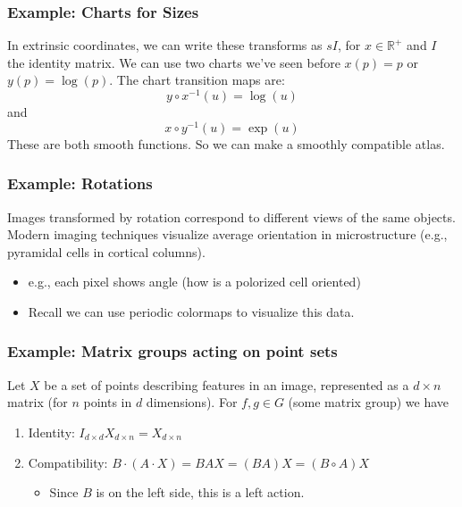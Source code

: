 \documentclass[10pt]{article}
\newcommand{\R}{\mathbb{R}}
\begin{document}
\subsubsection*{Example: Charts for Sizes}
In extrinsic coordinates, we can write these transforms as $sI$, for $x \in \R^+$ and $I$ the identity matrix.  We can use two charts we've seen before $x(p) = p$ or $y(p) = \log(p)$.  The chart transition maps are:
\[y \circ x^{-1}(u) = \log(u)\]
and
\[x \circ y^{-1}(u) = \exp(u)\]
These are both smooth functions.  So we can make a smoothly compatible atlas.

\subsubsection*{Example: Rotations}
Images transformed by rotation correspond to different views of the same objects.  Modern imaging techniques visualize average orientation in microstructure (e.g., pyramidal cells in cortical columns).
\begin{itemize}
    \item e.g., each pixel shows angle (how is a polorized cell oriented)
    \item Recall we can use periodic colormaps to visualize this data.
\end{itemize}

\subsubsection*{Example: Matrix groups acting on point sets}
Let $X$ be a set of points describing features in an image, represented as a $d \times n$ matrix (for $n$ points in $d$ dimensions).  For $f, g \in G$ (some matrix group) we have
\begin{enumerate}
    \item Identity: $I_{d \times d} X_{d \times n} = X_{d \times n}$
    \item Compatibility: $B \cdot (A \cdot X) = BAX = (BA)X = (B \circ A)X$
    \begin{itemize}
        \item Since $B$ is on the left side, this is a left action.
    \end{itemize}
\end{enumerate}
\end{document}
